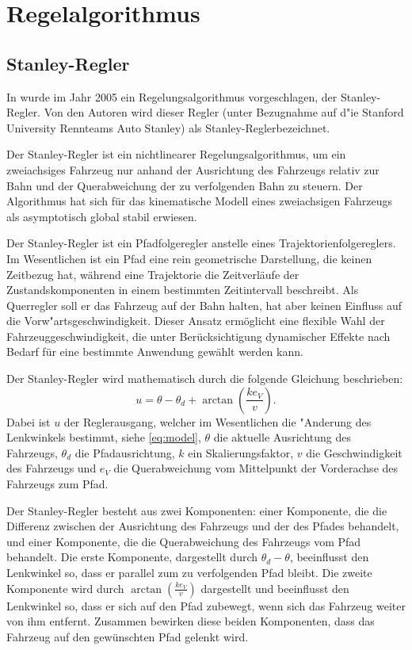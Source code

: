 \documentclass[arbeit=studie,oneside,BCOR=12mm]{ArbeitRST}
\begin{document}
\chapter{Regelalgorithmus}

\section{Stanley-Regler}

In \cite{stanley} wurde im Jahr 2005 ein Regelungsalgorithmus vorgeschlagen,
der Stanley-Regler. Von den Autoren wird dieser Regler (unter Bezugnahme auf
d"ie Stanford University Rennteams Auto \glqq Stanley\grqq) als
\glqq Stanley-Regler\grqq bezeichnet.

Der Stanley-Regler ist ein nichtlinearer Regelungsalgorithmus, um ein
zweiachsiges Fahrzeug nur anhand der Ausrichtung des Fahrzeugs relativ zur Bahn
und der Querabweichung der zu verfolgenden Bahn zu steuern. Der Algorithmus hat
sich für das kinematische Modell eines zweiachsigen Fahrzeugs als asymptotisch
global stabil erwiesen. \cite{stanley}

Der Stanley-Regler ist ein Pfadfolgeregler anstelle eines
Trajektorienfolgereglers. Im Wesentlichen ist ein Pfad eine rein geometrische
Darstellung, die keinen Zeitbezug hat, während eine Trajektorie die
Zeitverläufe der Zustandskomponenten in einem bestimmten Zeitintervall
beschreibt. Als Querregler soll er das Fahrzeug auf der Bahn halten, hat aber
keinen Einfluss auf die Vorw"artsgeschwindigkeit. Dieser Ansatz ermöglicht eine
flexible Wahl der Fahrzeuggeschwindigkeit, die unter Berücksichtigung
dynamischer Effekte nach Bedarf für eine bestimmte Anwendung gewählt werden
kann. \cite{stanley}

Der Stanley-Regler wird mathematisch durch die folgende Gleichung beschrieben:
\begin{equation} 
  u = \theta - \theta_d + \arctan\left(\frac{ke_{V}}{v}\right).
  \label{eq:Stanley-Regler} 
\end{equation}
Dabei ist $u$ der Reglerausgang, welcher im Wesentlichen die "Anderung des Lenkwinkels
bestimmt, siehe \eqref{eq:model}, $\theta$ die aktuelle Ausrichtung des Fahrzeugs,
$\theta_d$ die Pfadausrichtung, $k$ ein Skalierungsfaktor, $v$ die
Geschwindigkeit des Fahrzeugs und $e_{V}$ die Querabweichung vom Mittelpunkt
der Vorderachse des Fahrzeugs zum Pfad.

Der Stanley-Regler besteht aus zwei Komponenten: einer Komponente, die die
Differenz zwischen der Ausrichtung des Fahrzeugs und der des Pfades behandelt,
und einer Komponente, die die Querabweichung des Fahrzeugs vom Pfad behandelt.
Die erste Komponente, dargestellt durch $\theta_d - \theta$, beeinflusst den
Lenkwinkel so, dass er parallel zum zu verfolgenden Pfad bleibt. Die zweite
Komponente wird durch $\arctan(\frac{ke_{V}}{v})$ dargestellt und beeinflusst
den Lenkwinkel so, dass er sich auf den Pfad zubewegt, wenn sich das Fahrzeug
weiter von ihm entfernt. Zusammen bewirken diese beiden Komponenten, dass das
Fahrzeug auf den gewünschten Pfad gelenkt wird. \cite{steering-methods}
\end{document}
